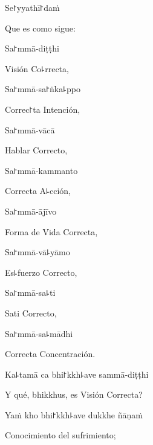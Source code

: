 Se꜓yyathī꜓daṁ

\begin{english}
	Que es como sigue:
\end{english}

Sa꜓mmā-diṭṭhi

\begin{english}
	Visión Co꜕rrecta,
\end{english}

Sa꜓mmā-sa꜓ṅka꜕ppo

\begin{english}
	Correc꜓ta Intención,
\end{english}

Sa꜓mmā-vācā

\begin{english}
	Hablar Correcto,
\end{english}

Sa꜓mmā-kammanto

\begin{english}
	Correcta A꜕cción,
\end{english}

Sa꜓mmā-ājīvo

\begin{english}
	Forma de Vida Correcta,
\end{english}

Sa꜓mmā-vā꜕yāmo

\begin{english}
	Es꜕fuerzo Correcto,
\end{english}

\ifaivedition
\clearpage
\fi

Sa꜓mmā-sa꜕ti

\begin{english}
	Sati Correcto,
\end{english}

Sa꜓mmā-sa꜕mādhi

\begin{english}
	Correcta Concentración.
\end{english}

Ka꜕tamā ca bhi꜓kkh꜕ave sammā-diṭṭhi

\begin{english}
	Y qué, bhikkhus, es Visión Correcta?
\end{english}

Yaṁ kho bhi꜓kkh꜕ave dukkhe ñāṇaṁ

\begin{english}
	Conocimiento del sufrimiento;
\end{english}


